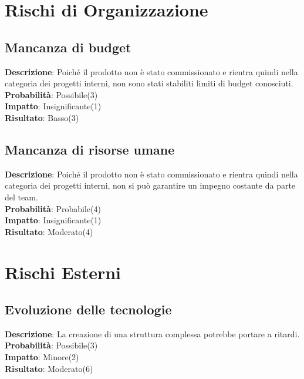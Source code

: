 \documentclass[12pt, a4paper]{article}
\begin{document}
\section{Rischi di Organizzazione}
\subsection{Mancanza di budget}
\textbf{Descrizione}: Poiché il prodotto non è stato commissionato e rientra quindi nella categoria dei progetti interni, non sono stati stabiliti limiti di budget conosciuti.\\
\textbf{Probabilità}: Possibile(3)\\
\textbf{Impatto}: Insignificante(1)\\
\textbf{Risultato}: Basso(3)\\

\subsection{Mancanza di risorse umane}
\textbf{Descrizione}: Poiché il prodotto non è stato commissionato e rientra quindi nella categoria dei progetti interni, non si può garantire un impegno costante da parte del team.\\
\textbf{Probabilità}: Probabile(4)\\
\textbf{Impatto}: Insignificante(1)\\
\textbf{Risultato}: Moderato(4)\\

\section{Rischi Esterni}
\subsection{Evoluzione delle tecnologie}
\textbf{Descrizione}: La creazione di una struttura complessa potrebbe portare a ritardi.\\
\textbf{Probabilità}: Possibile(3)\\
\textbf{Impatto}: Minore(2)\\
\textbf{Risultato}: Moderato(6)\\
\end{document}
